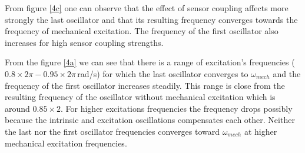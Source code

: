 \documentclass[a4paper]{scrartcl}
\begin{document}
From figure \ref{4c} one can observe that the effect of sensor coupling affects more strongly the last oscillator and that its resulting frequency converges towards the frequency of mechanical excitation. The frequency of the first oscillator also increases for high sensor coupling strengths.

From the figure \ref{4a} we can see that there is a range of excitation's frequencies ($0.8\times2\pi-0.95\times2\pi$\,rad/s) for which the last oscillator converges to $\omega_{mech}$ and the frequency of the first oscillator increases steadily. This range is close from the resulting frequency of the oscillator without mechanical excitation which is around $0.85\times2$. For higher excitations frequencies the frequency drops possibly because the intrinsic and excitation oscillations compensates each other. Neither the last nor the first oscillator frequencies converges toward $\omega_{mech}$ at higher mechanical excitation frequencies.
\newpage
\end{document}
